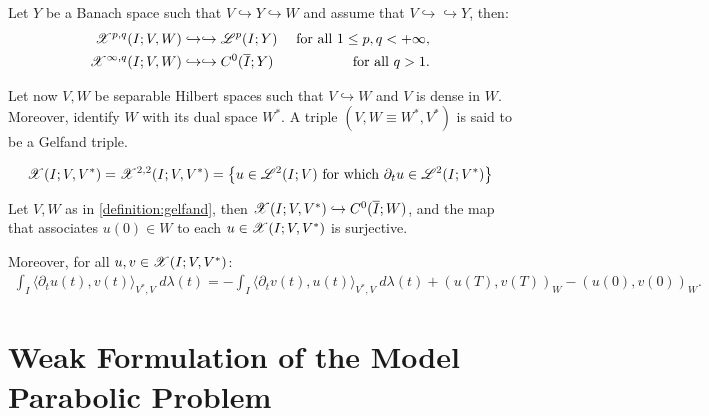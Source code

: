 \begin{theorem}
    Let $Y$ be a Banach space such that $V \hookrightarrow Y \hookrightarrow W$ and assume that $V \hookrightarrow \hookrightarrow Y$, then:
    \begin{align}
        \mathscr{X}^{p, q}(I; V, W) &\hookrightarrow \hookrightarrow \mathscr{L}^{p}(I; Y) &\text{ for all } 1 \leq p, q < +\infty,\\
        \mathscr{X}^{\infty, q}(I; V, W) &\hookrightarrow \hookrightarrow C^0(\overline{I}; Y) &\text{ for all } q > 1.
    \end{align}
\end{theorem}

\begin{definition} \label{definition:gelfand}
    Let now $V, W$ be separable Hilbert spaces such that $V \hookrightarrow W$ and $V$ is dense in $W$. Moreover, identify $W$ with its dual space $W^*$. A triple $\left( V, W \equiv W^*, V^* \right)$ is said to be a Gelfand triple.
\end{definition}

\begin{definition}[$\SpaceX(I; V, V^*)$] \label{definition:x}
    \begin{align}
        \mathscr{X}(I; V, V^*) = \mathscr{X}^{2, 2}(I; V, V^*) = \left\{ u \in \mathscr{L}^{2}(I; V) \text{ for which } \partial_t u \in \mathscr{L}^{2}(I; V^*) \right\}
    \end{align}
\end{definition}

\begin{theorem}
    Let $V, W$ as in \cref{definition:gelfand}, then \newline \nobreak $\mathscr{X}(I; V, V^*) \hookrightarrow C^0(\overline{I};W)$, and the map that associates $u(0) \in W$ to each $u \in \mathscr{X}(I; V, V^*)$ is surjective.

    Moreover, for all $u, v \in \mathscr{X}(I; V, V^*)$:
    \begin{align}
        \int_I \langle \partial_t u(t), v(t) \rangle_{V^*, V} ~ d \lambda(t) = - \int_I \langle \partial_t v(t), u(t) \rangle_{V^*, V} ~ d \lambda(t) + \left( u(T), v(T) \right)_W - \left( u(0), v(0) \right)_W.
    \end{align}
\end{theorem}

\newpage
\section{Weak Formulation of the Model Parabolic Problem}

